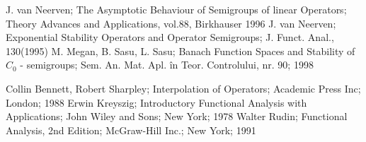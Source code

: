 \documentclass[12pt]{report}
\begin{document}
\begin{thebibliography}{1}

\bibitem{}
  J. van Neerven;
  The Asymptotic Behaviour of Semigroups of linear Operators; Theory Advances and Applications, vol.88, Birkhauser 1996
\bibitem{}
  J. van Neerven;
  Exponential Stability Operators and Operator Semigroups; J. Funct. Anal., 130(1995)
  \bibitem{}
  M. Megan, B. Sasu, L. Sasu; Banach Function Spaces  and Stability of ${C_{0}}$ - semigroups; Sem. An. Mat. Apl. \^ in Teor. Controlului, nr. 90; 1998
  
  \bibitem{}
  Collin Bennett, Robert Sharpley; Interpolation of Operators; Academic Press Inc; London; 1988
  \bibitem{}
  Erwin Kreyszig;  Introductory Functional Analysis with Applications; John Wiley and Sons; New York; 1978
  \bibitem{}
  Walter Rudin; Functional Analysis, 2nd Edition; McGraw-Hill Inc.; New York; 1991

\end{thebibliography}
\end{document}
